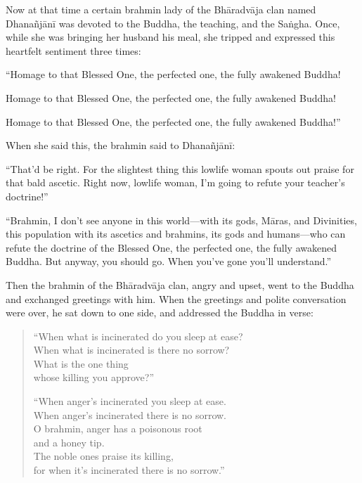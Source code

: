 \documentclass[12pt,openany]{book}%
\begin{document}
Now at that time a certain brahmin lady of the \textsanskrit{Bhāradvāja} clan named \textsanskrit{Dhanañjānī} was devoted to the Buddha, the teaching, and the \textsanskrit{Saṅgha}. Once, while she was bringing her husband his meal, she tripped and expressed this heartfelt sentiment three times: 

“Homage to that Blessed One, the perfected one, the fully awakened Buddha! 

Homage to that Blessed One, the perfected one, the fully awakened Buddha! 

Homage to that Blessed One, the perfected one, the fully awakened Buddha!” 

When she said this, the brahmin said to \textsanskrit{Dhanañjānī}: 

“That’d be right. For the slightest thing this lowlife woman spouts out praise for that bald ascetic. Right now, lowlife woman, I’m going to refute your teacher’s doctrine!” 

“Brahmin, I don’t see anyone in this world—with its gods, \textsanskrit{Māras}, and Divinities, this population with its ascetics and brahmins, its gods and humans—who can refute the doctrine of the Blessed One, the perfected one, the fully awakened Buddha. But anyway, you should go. When you’ve gone you’ll understand.” 

Then the brahmin of the \textsanskrit{Bhāradvāja} clan, angry and upset, went to the Buddha and exchanged greetings with him. When the greetings and polite conversation were over, he sat down to one side, and addressed the Buddha in verse: 

\begin{verse}%
“When what is incinerated do you sleep at ease? \\
When what is incinerated is there no sorrow? \\
What is the one thing \\
whose killing you approve?” 

“When anger’s incinerated you sleep at ease. \\
When anger’s incinerated there is no sorrow. \\
O brahmin, anger has a poisonous root \\
and a honey tip. \\
The noble ones praise its killing, \\
for when it’s incinerated there is no sorrow.” 

%
\end{verse}
\end{document}
